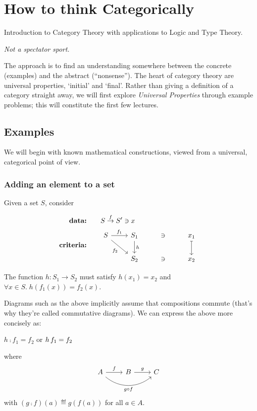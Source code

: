 \tableofcontents

\newpage
\chapter{How to think Categorically}

Introduction to Category Theory with applications to Logic and Type Theory.

\emph{Not a spectator sport.}

The approach is to find an understanding somewhere between the concrete
(examples) and the abstract (``nonsense''). The heart of category theory are
universal properties, `initial' and `final'.
Rather than giving a definition of a category straight away, we will first
explore \emph{Universal Properties} through example problems; this will
constitute the first few lectures.

\section{Examples}
We will begin with known mathematical constructions, viewed from a universal,
categorical point of view.

\subsection{Adding an element to a set}
\label{add-element-set}

Given a set $S$, consider

\begin{align*}
    \textbf{data:}&\qquad S \overset{f}{\rightarrow} S^\prime \ni x \\
    \textbf{criteria:}& \qquad
    \begin{tikzcd}[ampersand replacement=\&]
        S \arrow[r, "f_1"]
          \arrow[dr, swap, "f_2"]
          \&
        S_1 \arrow[d, "h"] \& \ni \& x_1 \arrow[d, mapsto]
          \\
          {}\&
        S_2 \& \ni \& x_2
    \end{tikzcd}
\end{align*}

The function $h : S_1 \rightarrow S_2$ must satisfy $h(x_1) = x_2$ and
$\forall x \in S .\; h(f_1(x)) = f_2(x)$.

\begin{framed}
Diagrams such as the above implicitly assume that compositions commute (that's
why they're called commutative diagrams). We can express the above more
concisely as:
\begin{center}
$h\comp f_1 = f_2$
\quad or \quad
$h\, f_1 = f_2$
\end{center}
where
$$
\begin{tikzcd}
    A \arrow[r, "f"] \arrow[rr, swap, bend right=40, "g \circ f"] & B \arrow[r, "g"] & C
\end{tikzcd}
$$
with $(g\comp f)(a)\eqdef g(f(a))$ for all $a\in A$.
\end{framed}

